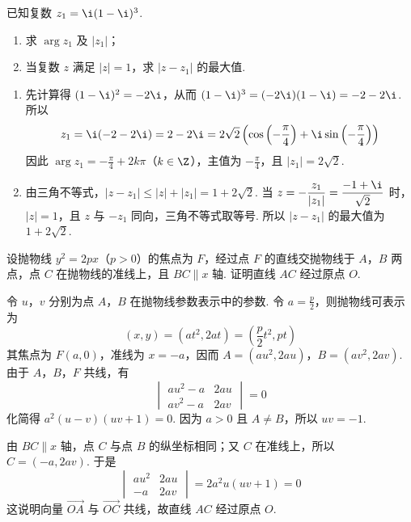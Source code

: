 \begin{problem}
已知复数 \(z_{1} = \i(1 - \i)^{3}\).

\begin{enumerate}
\item 求 \(\arg z_{1}\) 及 \(|z_{1}|\)；
\item 当复数 \(z\) 满足 \(|z| = 1\)，求 \(|z - z_1|\) 的最大值.
\end{enumerate}
\end{problem}

\begin{solution}
\begin{enumerate}
\item 先计算得 \((1-\i)^2=-2\i\)，从而 \((1-\i)^3=(-2\i)(1-\i)=-2-2\i\). 所以
\[
z_1=\i(-2-2\i)=2-2\i=2\sqrt2\left(\cos\left(-\frac\pi4\right)+\i\sin\left(-\frac\pi4\right)\right)
\]
因此 \(\arg z_1=-\frac\pi4+2k\pi\)（\(k\in\Z\)），主值为 \(-\frac\pi4\)，且 \(|z_1|=2\sqrt2\).
\item 由三角不等式，\(|z-z_1|\leqslant |z|+|z_1|=1+2\sqrt2\). 当 \(z=-\dfrac{z_1}{|z_1|}=\dfrac{-1+\i}{\sqrt2}\) 时，\(|z|=1\)，且 \(z\) 与 \(-z_1\) 同向，三角不等式取等号. 所以 \(|z-z_1|\) 的最大值为 \(1+2\sqrt2\).
\end{enumerate}
\end{solution}

\begin{problem}
设抛物线 \( y^{2} = 2px \)（\( p > 0 \)）的焦点为 \(F\)，经过点 \(F\) 的直线交抛物线于 \(A\)，\(B\) 两点，点 \(C\) 在抛物线的准线上，且 \( BC \parallel x \) 轴. 证明直线 \(AC\) 经过原点 \(O\).
\end{problem}

\begin{solution}
令 \(u\)，\(v\) 分别为点 \(A\)，\(B\) 在抛物线参数表示中的参数. 令 \(a=\frac p2\)，则抛物线可表示为
\[
(x,y)=(at^2,2at)=\left(\frac p2t^2,pt\right)
\]
其焦点为 \(F(a,0)\)，准线为 \(x=-a\)，因而 \(A=(au^2,2au)\)，\(B=(av^2,2av)\).
由于 \(A\)，\(B\)，\(F\) 共线，有
\[
\begin{vmatrix}
au^2-a & 2au\\
av^2-a & 2av
\end{vmatrix}=0
\]
化简得 \(a^2(u-v)(uv+1)=0\). 因为 \(a>0\) 且 \(A\ne B\)，所以 \(uv=-1\).

由 \(BC\parallel x\) 轴，点 \(C\) 与点 \(B\) 的纵坐标相同；又 \(C\) 在准线上，所以 \(C=(-a,2av)\). 于是
\[
\begin{vmatrix}
au^2 & 2au\\
-a & 2av
\end{vmatrix}=2a^2u(uv+1)=0
\]
这说明向量 \(\overrightarrow{OA}\) 与 \(\overrightarrow{OC}\) 共线，故直线 \(AC\) 经过原点 \(O\).
\end{solution}

